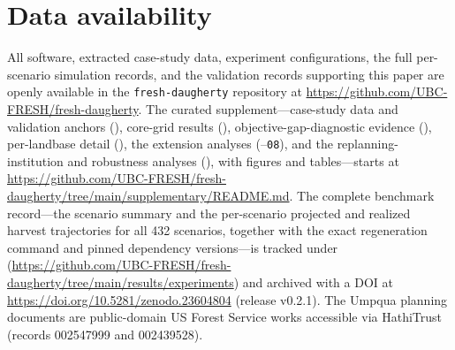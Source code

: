 \documentclass[12pt]{article}
\begin{document}
\section*{Data availability}
All software, extracted case-study data, experiment configurations, the full per-scenario simulation records, and the validation records supporting this paper are openly available in the \texttt{fresh-daugherty} repository at \url{https://github.com/UBC-FRESH/fresh-daugherty}. The curated supplement---case-study data and validation anchors (), core-grid results (), objective-gap-diagnostic evidence (), per-landbase detail (), the extension analyses (--\texttt{08}), and the replanning-institution and robustness analyses (), with figures and tables---starts at \url{https://github.com/UBC-FRESH/fresh-daugherty/tree/main/supplementary/README.md}. The complete benchmark record---the scenario summary and the per-scenario projected and realized harvest trajectories for all 432 scenarios, together with the exact regeneration command and pinned dependency versions---is tracked under  (\url{https://github.com/UBC-FRESH/fresh-daugherty/tree/main/results/experiments}) and archived with a DOI at \url{https://doi.org/10.5281/zenodo.23604804} (release v0.2.1). The Umpqua planning documents are public-domain US Forest Service works accessible via HathiTrust (records 002547999 and 002439528).



\end{document}
